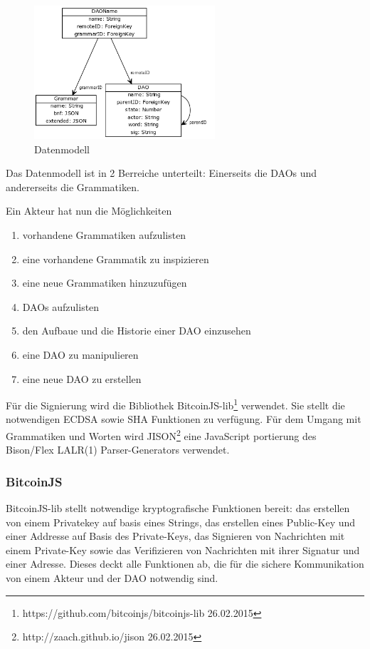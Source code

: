 \documentclass[a4paper,12pt]{report}
\begin{document}
\begin{figure}[ht]
    \centering
    \includegraphics[width=0.60\textwidth]{bilder/dataModel.png}
    \caption{Datenmodell}
\end{figure}

Das Datenmodell ist in 2 Berreiche unterteilt: Einerseits die DAOs und andererseits die Grammatiken. 

Ein Akteur hat nun die Möglichkeiten 

\begin{enumerate}
  \item vorhandene Grammatiken aufzulisten
  \item eine vorhandene Grammatik zu inspizieren
  \item eine neue Grammatiken hinzuzufügen
  \item DAOs aufzulisten
  \item den Aufbaue und die Historie einer DAO einzusehen
  \item eine DAO zu manipulieren
  \item eine neue DAO zu erstellen
\end{enumerate}

Für die Signierung wird die Bibliothek BitcoinJS-lib\footnote{https://github.com/bitcoinjs/bitcoinjs-lib 26.02.2015} verwendet. Sie stellt die notwendigen ECDSA sowie SHA Funktionen zu verfügung. Für dem Umgang mit Grammatiken und Worten wird JISON\footnote{http://zaach.github.io/jison 26.02.2015} eine JavaScript portierung des Bison/Flex LALR(1) Parser-Generators verwendet.

\subsubsection*{BitcoinJS}
BitcoinJS-lib stellt notwendige kryptografische Funktionen bereit: das erstellen von einem Privatekey auf basis eines Strings, das erstellen eines Public-Key und einer Addresse auf Basis des Private-Keys, das Signieren von Nachrichten mit einem Private-Key sowie das Verifizieren von Nachrichten mit ihrer Signatur und einer Adresse. Dieses deckt alle Funktionen ab, die für die sichere Kommunikation von einem Akteur und der DAO notwendig sind.
\end{document}
